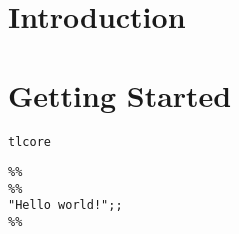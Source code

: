 \documentclass[a4paper]{article}
\begin{document}
\section{Introduction}

\section{Getting Started}

\begin{verbatim}
tlcore
\end{verbatim}

\begin{verbatim}
%%
%%
"Hello world!";;
%%
\end{verbatim}
\end{document}

